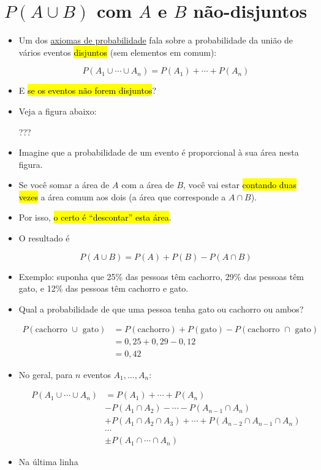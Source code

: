 \documentclass[
  11pt]{report}
\begin{document}
\hypertarget{pa-cup-b-com-a-e-b-nuxe3o-disjuntos}{%
\section{\texorpdfstring{$P(A \cup B)$ com $A$ e $B$ não-disjuntos}{ com  e  não-disjuntos}}\label{pa-cup-b-com-a-e-b-nuxe3o-disjuntos}}

\begin{itemize}
\item
  Um dos \protect\hyperlink{axiomas}{axiomas de probabilidade} fala sobre a probabilidade da união de vários eventos {\hl{disjuntos}} (sem elementos em comum):

  \[
  P(A_1 \cup \cdots \cup A_n) = P(A_1) + \cdots + P(A_n)
  \]
\item
  E {\hl{se os eventos não forem disjuntos}}?
\item
  Veja a figura abaixo:

  ???
\item
  Imagine que a probabilidade de um evento é proporcional à sua área nesta figura.
\item
  Se você somar a área de $A$ com a área de $B$, você vai estar {\hl{contando duas vezes}} a área comum aos dois (a área que corresponde a $A \cap B$).
\item
  Por isso, {\hl{o certo é ``descontar'' esta área}}.
\item
  O resultado é

  \[
  P(A \cup B) = P(A) + P(B) - P(A \cap B)
  \]
\item
  Exemplo: suponha que 25\% das pessoas têm cachorro, 29\% das pessoas têm gato, e 12\% das pessoas têm cachorro e gato.
\item
  Qual a probabilidade de que uma pessoa tenha gato ou cachorro ou ambos?

  \[
  \begin{aligned}
  P(\text{cachorro } \cup \text{ gato}) 
    &= P(\text{cachorro}) + P(\text{gato}) - P(\text{cachorro } \cap \text{ gato}) \\
    &= 0{,}25 + 0{,}29 - 0{,}12 \\
    &= 0{,}42
  \end{aligned}
  \]
\item
  No geral, para $n$ eventos $A_1, \ldots, A_n$:

  \[
  \begin{aligned}
  P(A_1 \cup \cdots \cup A_n) &=
    P(A_1) + \cdots + P(A_n) \\
    & - P(A_1 \cap A_2) - \cdots - P(A_{n-1} \cap A_n) \\
    & + P(A_1 \cap A_2 \cap A_3) + \cdots + P(A_{n-2} \cap A_{n-1} \cap A_n) \\
    & \cdots \\
    & \pm P(A_1 \cap \cdots \cap A_n )
  \end{aligned}
  \]
\item
  Na última linha


\end{itemize}
\end{document}
